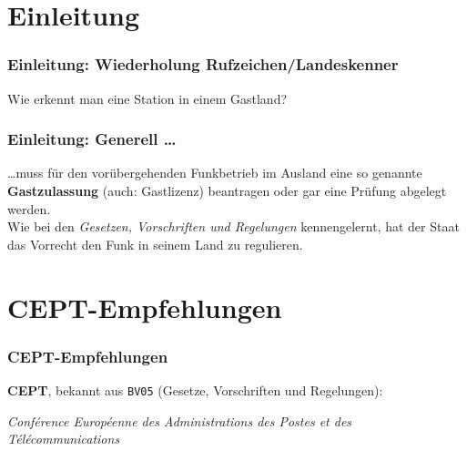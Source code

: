 

\subtitle{Betriebstechnik/Vorschriften 07: \\
  Funkbetrieb im Ausland \\[2em]}
\date{Stand 18.09.2017}


\section{Einleitung}

\begin{frame}
  \frametitle{Einleitung: Wiederholung Rufzeichen/Landeskenner}

  \begin{center}
    \Large{Wie erkennt man eine Station in einem Gastland?}
  \end{center}

\end{frame}

\begin{frame}
  \frametitle{Einleitung: Generell \ldots}

  \ldots muss für den vorübergehenden Funkbetrieb im Ausland eine so genannte
  \textbf{Gastzulassung} (auch: Gastlizenz) beantragen oder gar eine Prüfung
  abgelegt werden. \\[1em]

  Wie bei den \emph{Gesetzen, Vorschriften und Regelungen} kennengelernt, hat
  der Staat das Vorrecht den Funk in seinem Land zu regulieren.

\end{frame}

\section{CEPT-Empfehlungen}

\begin{frame}
  \frametitle{CEPT-Empfehlungen}

  \textbf{CEPT}, bekannt aus \texttt{BV05} (Gesetze, Vorschriften und Regelungen): \\[1em]

  \begin{center}
    \emph{Conférence Européenne des Administrations des Postes et des
    Télécommunications}
  \end{center}

\end{frame}

